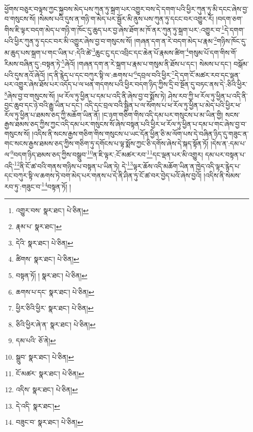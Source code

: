ཕྱོགས་བཅུར་བལྟས་ཀྱང་སྐྱབས་མེད་པས་ཀུན་ཏུ་སྐྲག་པར་འགྱུར་བས་དེ་དགག་པའི་ཕྱིར་ཀུན་ཏུ་མི་དངང་ཞེས་བྱ་བ་གསུངས་སོ། །སེམས་པའི་དུས་ན་གཉི་ག་མེད་པར་སྦྱོར་མི་ནུས་པས་ཀུན་ཏུ་དངང་བར་འགྱུར་རོ། །བདག་ཅག་གིས་ཇི་ལྟར་བདག་མེད་པ་གཉི་ག་ཁོང་དུ་ཆུད་པར་བྱ་ཞེས་ཐོག་མ་ཁོ་ནར་ཀུན་ཏུ་སྐྲག་པར་:འགྱུར་བ་\footnote{འགྱུར་བས་  སྣར་ཐང་།  པེ་ཅིན། }དེ་དགག་པའི་ཕྱིར་ཀུན་ཏུ་དངང་བར་མི་འགྱུར་ཞེས་བྱ་བ་གསུངས་སོ། །གཞན་དག་ན་རེ་བདག་མེད་པ་རྣམ་\footnote{རྣམ་པ་  སྣར་ཐང་། }གཉིས་ཁོང་དུ་མ་ཆུད་པས་སྐྲག་པ་གང་ཡིན་པ་:དེའི་ཚེ་\footnote{དེའི་  སྣར་ཐང་།  པེ་ཅིན། }ཆུང་ངུ་དང་འབྲིང་དང་ཆེན་པོ་རྣམས་ཚིག་\footnote{ཚིགས་  སྣར་ཐང་།  པེ་ཅིན། }གསུམ་པོ་དག་གིས་གོ་རིམས་བཞིན་དུ་:བསྟན་ཏེ་\footnote{བསྟན་ཏོ། །  སྣར་ཐང་།  པེ་ཅིན། }ཞེའོ། །གཞན་དག་ན་རེ་སྐྲག་པ་རྣམ་པ་གསུམ་ནི་ཐོས་པ་དང་། སེམས་པ་དང་། བསྒོམ་པའི་དུས་ནའོ་ཞེའོ། །ད་ནི་རྙེད་པ་དང་བཀུར་སྟི་ལ་:ཆགས་པ་\footnote{ཆགས་པ་དང་  སྣར་ཐང་།  པེ་ཅིན། }དབྲལ་བའི་ཕྱིར་\footnote{ཕྱིར་ཅིའི་ཕྱིར་  སྣར་ཐང་།  པེ་ཅིན། }དེ་དག་ངོ་མཚར་རབ་དང་ལྡན་པར་འགྱུར་ཞེས་ཐོས་པར་འདོད་པ་ལ་ཕན་གདགས་པའི་ཕྱིར་བདག་ཉིད་ཀྱིས་དྲི་བ་སྔོན་དུ་བཏང་ནས་དེ་:ཅིའི་ཕྱིར་\footnote{ཅིའི་ཕྱིར་ཞེ་ན་  སྣར་ཐང་།  པེ་ཅིན། }ཞེས་བྱ་བ་གསུངས་སོ། །ཕ་རོལ་ཏུ་ཕྱིན་པ་དམ་པ་འདི་ནི་ཞེས་བྱ་བ་སྨོས་ཏེ། ཤེས་རབ་ཀྱི་ཕ་རོལ་ཏུ་ཕྱིན་པ་འདི་ནི་བྱང་ཆུབ་དང་ཉེ་བའི་རྒྱུ་ཡིན་པ་དང་། འདི་དང་བྲལ་བའི་སྦྱིན་པ་ལ་སོགས་པ་ཕ་རོལ་ཏུ་ཕྱིན་པ་མེད་པའི་ཕྱིར་ཕ་རོལ་ཏུ་ཕྱིན་པ་ཐམས་ཅད་ཀྱི་མཆོག་ཡིན་ནོ། །ང་ཉག་གཅིག་གིས་འདི་དམ་པར་གསུངས་པ་མ་ཡིན་གྱི། སངས་རྒྱས་ཐམས་ཅད་ཀྱིས་ཀྱང་འདི་དམ་པར་གསུངས་སོ་ཞེས་བསྟན་པའི་ཕྱིར་ཕ་རོལ་ཏུ་ཕྱིན་པ་དམ་པ་གང་ཞེས་བྱ་བ་གསུངས་སོ། །འདིས་ནི་སངས་རྒྱས་གཅིག་གིས་གསུངས་པ་ཡང་དོན་ཕྱིན་ཅི་མ་ལོག་པས་དེ་བཞིན་ཉིད་དུ་གཟུང་ན་གང་སངས་རྒྱས་ཐམས་ཅད་ཀྱིས་གཅིག་ཏུ་དགོངས་པ་ལྟ་སྨོས་ཀྱང་ཅི་དགོས་ཞེས་དེ་སྐད་སྟོན་ཏོ། །དེས་ན་:དམ་པ་ལ་\footnote{དམ་པའི་  ཅོ་ནེ། }བདག་ཉིད་ཐམས་ཅད་ཀྱིས་བསྒྲུབ་\footnote{སྒྲུབ་  སྣར་ཐང་།  པེ་ཅིན། }ན་ཇི་ལྟར་:ངོ་མཚར་རབ་\footnote{ངོ་མཚར་  སྣར་ཐང་།  པེ་ཅིན། }དང་ལྡན་པར་མི་འགྱུར། དམ་པར་བསྟན་པ་འདི་\footnote{འདིས་  སྣར་ཐང་།  པེ་ཅིན། }ནི་ངོ་ཚ་བའི་གནས་གཉིས་པ་བསྟན་པ་ཡིན་ཏེ། དེ་\footnote{དེ་འདི་  སྣར་ཐང་། }ལྟར་ཆོས་འདི་མཆོག་ཡིན་ན་ཁྱེད་འདི་ལྟར་རྙེད་པ་དང་བཀུར་སྟི་ལ་ཆགས་ཏེ་བག་མེད་པར་གནས་པ་དེ་ནི་ཤིན་ཏུ་ངོ་ཚ་བར་བྱེད་པའོ་ཞེས་བྱའོ། །འདིས་ནི་སེམས་རབ་ཏུ་:གཟུང་བ་\footnote{བཟུང་བ་  སྣར་ཐང་།  པེ་ཅིན། }བསྟན་ཏོ། །
